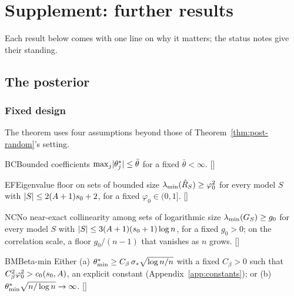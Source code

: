 \section{Supplement: further results}\label{sec:supp}

Each result below comes with one line on why it matters; the status notes give their standing.

\subsection{The posterior}\label{sec:supp-post}

\subsubsection{Fixed design}\label{sec:supp-fixed}


The theorem uses four assumptions beyond those of Theorem~\ref{thm:post-random}'s setting.

\begin{assumption}{BC}{Bounded coefficients}
$\max_{j}\lvert \theta^*_j\rvert\le\bar\theta$ for a fixed $\bar\theta<\infty$. \hfill []
\end{assumption}

\begin{assumption}{EF}{Eigenvalue floor on sets of bounded size}
$\lambda_{\min}(\hat R_S)\ge\varphi_0^2$ for every model $S$ with $\lvert S\rvert\le2(A+1)s_0+2$, for a fixed $\varphi_0\in(0,1]$. \hfill []
\end{assumption}

\begin{assumption}{NC}{No near-exact collinearity among sets of logarithmic size}
$\lambda_{\min}(G_S)\ge g_0$ for every model $S$ with $\lvert S\rvert\le3(A+1)(s_0+1)\log n$, for a fixed $g_0>0$; on the correlation
scale, a floor $g_0/(n-1)$ that vanishes as $n$ grows. \hfill []
\end{assumption}

\begin{assumption}{BM}{Beta-min}
Either (a) $\theta^*_{\min}\ge C_\beta\,\sigma_*\sqrt{\log n/n}$ with a fixed $C_\beta>0$ such that $C_\beta^2\varphi_0^2>c_0(s_0,A)$, an explicit
constant (Appendix~\ref{app:constants}); or (b) $\theta^*_{\min}\sqrt{n/\log n}\to\infty$. \hfill []
\end{assumption}

